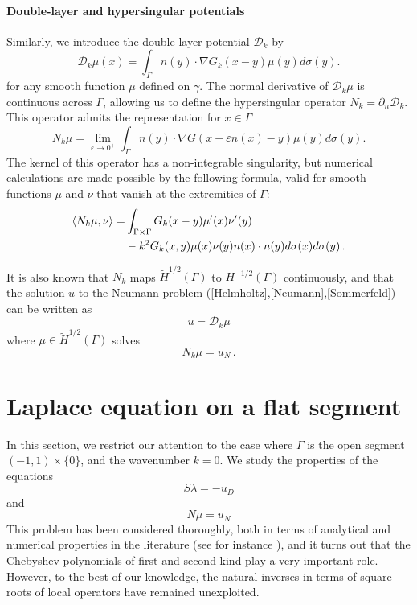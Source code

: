 \documentclass[a4paper]{article}
\begin{document}
\paragraph{Double-layer and hypersingular potentials}
Similarly, we introduce the double layer potential $\mathcal{D}_k$ by 
\[\mathcal{D}_k \mu(x) = \int_{\Gamma} n(y) \cdot \nabla G_k(x-y) \mu(y) d\sigma(y).\]
for any smooth function $\mu$ defined on $\gamma$.
The normal derivative of $\mathcal{D}_k\mu$ is continuous across $\Gamma$, allowing us to define the hypersingular operator $N_k = \partial_n \mathcal{D}_k$. This operator admits the representation for $x\in \Gamma$
\begin{equation}
	N_k \mu = \lim_{\varepsilon \to 0^+} \int_{\Gamma} n(y) \cdot \nabla G(x + \varepsilon n(x) - y) \mu(y) d\sigma(y).
	\label{defNk}
\end{equation}
The kernel of this operator has a non-integrable singularity, but numerical calculations are made possible by the following formula, valid for smooth functions $\mu$ and $\nu$ that vanish at the extremities of $\Gamma$: 
\begin{equation}
	\begin{split}
		\left\langle N_k \mu,\nu\right\rangle = &\int_{\Gamma\times \Gamma} G_k(x-y) \mu'(x) \nu'(y)\\
		&- k^2 G_k(x,y) \mu(x) \nu(y) n(x) \cdot n(y) d\sigma(x) d\sigma(y)\,.
	\end{split}
	\label{NkenfonctiondeSk}
\end{equation}

It is also known that $N_k$ maps $\tilde{H}^{1/2}(\Gamma)$ to $H^{-1/2}(\Gamma)$ continuously, and that the solution $u$ to the Neumann problem (\ref{Helmholtz},\ref{Neumann},\ref{Sommerfeld}) can be written as
\begin{equation}
	u = \mathcal{D}_k \mu
\end{equation}
where $\mu \in \tilde{H}^{1/2}(\Gamma)$ solves
\begin{equation}
	N_k \mu = u_N\,.
	\label{Nkmu}
\end{equation}  
	
\section{Laplace equation on a flat segment}\label{sec:laplace-equation-on-a-flat-segmentsec:laplace-equation-on-a-flat-segment}

In this section, we restrict our attention to the case where $\Gamma$ is the open segment $(-1,1) \times \{0\}$, and the wavenumber $k=0$. We study the properties of the equations 
\[S\lambda = -u_D\]
and 
\[N\mu = u_N\]
This problem has been considered thoroughly, both
in terms of analytical and numerical properties in the literature (see for instance \cite{jiang2004second,bruno2012second}), and it turns out that the Chebyshev polynomials of first and second kind play a very important role. However, to the best of our knowledge, the natural inverses in terms of square roots of local operators have remained unexploited. 
\end{document}
